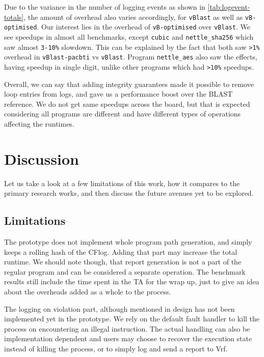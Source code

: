 \documentclass[a4paper, nobind]{templates/ociamthesis}
\begin{document}
Due to the variance in the number of logging events as shown in \ref{tab:logevent-totals},
the amount of overhead also varies accordingly, for \texttt{vBlast} as well as \texttt{vB-optimised}.
Our interest lies in the overhead of \texttt{vB-optimised} over \texttt{vBlast}. We see speedups
in almost all benchmarks, except \texttt{cubic} and \texttt{nettle\_sha256} which saw almost \texttt{3-10\%}
slowdown. This can be explained by the fact that both saw \texttt{\textgreater{}1\%} overhead in
\texttt{vBlast-pacbti} vs \texttt{vBlast}. Program \texttt{nettle\_aes} also saw the effects, having speedup
in single digit, unlike other programs which had \texttt{\textgreater{}10\%} speedups.

Overall, we can say that adding integrity guarantees made it possible to remove
loop entries from logs, and gave us a performance boost over the BLAST reference.
We do not get same speedups across the board, but that is expected considering all
programs are different and have different types of operations affecting the runtimes.

\chapter{Discussion}\label{discussion}

\minitoc 

Let us take a look at a few limitations of this work, how it compares to
the primary research works, and then discuss the future avenues yet to be explored.

\section{Limitations}\label{limitations-2}

The prototype does not implement whole program path generation, and simply keeps
a rolling hash of the CFlog. Adding that part may increase the total runtime. We
should note though, that report generation is not a part of the regular program
and can be considered a separate operation. The benchmark results still include the
time spent in the TA for the wrap up, just to give an idea about the overheads
added as a whole to the process.

The logging on violation part, although mentioned in design has not been implemented yet
in the prototype. We rely on the default fault handler to kill the process on encountering
an illegal instruction. The actual handling can also be implementation dependent
and users may choose to recover the execution state instead of killing the process,
or to simply log and send a report to Vrf.
\end{document}
